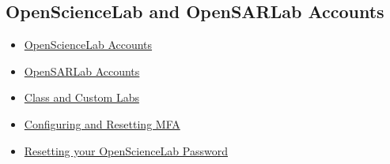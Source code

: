 \subsection{OpenScienceLab and OpenSARLab Accounts}

\begin{itemize}
\item \href{/opensciencelab-accounts}{OpenScienceLab Accounts}
\item \href{/opensarlab-accounts}{OpenSARLab Accounts}
\item \href{/custom-deployment-access}{Class and Custom Labs}
\item \href{/mfa}{Configuring and Resetting MFA}
\item \href{/reset-password}{Resetting your OpenScienceLab Password}
\end{itemize}